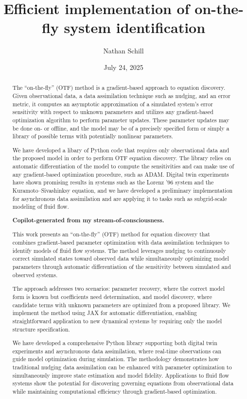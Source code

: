 \documentclass[12pt]{article}
\title{Efficient implementation of on-the-fly system identification}
\author{Nathan Schill}
\date{July 24, 2025}
\begin{document}
\maketitle

\begin{abstract}
  The ``on-the-fly'' (OTF) method is a gradient-based approach to equation discovery.
  Given observational data, a data assimilation technique such as nudging, and an error metric, it computes an asymptotic approximation of a simulated system's error sensitivity with respect to unknown parameters and utilizes any gradient-based optimization algorithm to perform parameter updates.
  These parameter updates may be done on- or offline, and the model may be of a precisely specified form or simply a library of possible terms with potentially nonlinear parameters.

  We have developed a libary of Python code that requires only observational data and the proposed model in order to perform OTF equation discovery.
  The library relies on automatic differentiation of the model to compute the sensitivities and can make use of any gradient-based optimization procedure, such as ADAM.
  Digital twin experiments have shown promising results in systems such as the Lorenz '96 system and the Kuramoto--Sivashinksy equation, and we have developed a preliminary implementation for asynchronous data assimilation and are applying it to tasks such as subgrid-scale modeling of fluid flow.

  \textbf{Copilot-generated from my stream-of-consciousness.}

  This work presents an ``on-the-fly'' (OTF) method for equation discovery that combines gradient-based parameter optimization with data assimilation techniques to identify models of fluid flow systems.
  The method leverages nudging to continuously correct simulated states toward observed data while simultaneously optimizing model parameters through automatic differentiation of the sensitivity between simulated and observed systems.
  
  The approach addresses two scenarios: parameter recovery, where the correct model form is known but coefficients need determination, and model discovery, where candidate terms with unknown parameters are optimized from a proposed library.
  We implement the method using JAX for automatic differentiation, enabling straightforward application to new dynamical systems by requiring only the model structure specification.
  
  We have developed a comprehensive Python library supporting both digital twin experiments and asynchronous data assimilation, where real-time observations can guide model optimization during simulation.
  The methodology demonstrates how traditional nudging data assimilation can be enhanced with parameter optimization to simultaneously improve state estimation and model fidelity.
  Applications to fluid flow systems show the potential for discovering governing equations from observational data while maintaining computational efficiency through gradient-based optimization.


\end{abstract}
\end{document}
